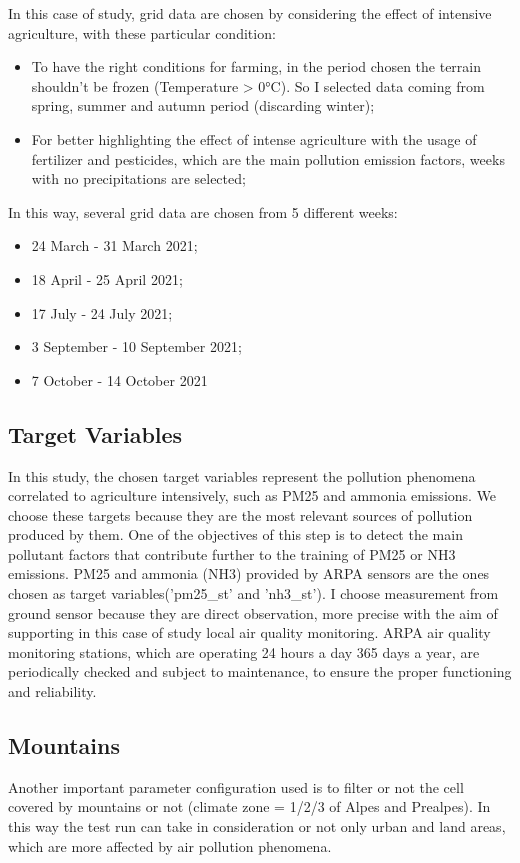 In this case of study, grid data are chosen by considering the effect of intensive agriculture, with these particular condition:
    \begin{itemize}
        \item To have the right conditions for farming, in the period chosen the terrain shouldn't be frozen (Temperature > 0°C). So I selected data coming from spring, summer and autumn period (discarding winter);
        \item For better highlighting the effect of intense agriculture with the usage of fertilizer and pesticides, which are the main pollution emission factors, weeks with no precipitations are selected;
\end{itemize}
In this way, several grid data are chosen from 5 different weeks:
\begin{itemize}
    \item 24 March - 31 March 2021;
    \item 18 April - 25 April 2021;
    \item 17 July - 24 July 2021;
    \item 3 September - 10 September 2021;
    \item 7 October - 14 October 2021
\end{itemize}

\subsection{Target Variables}
In this study, the chosen target variables represent the pollution phenomena correlated to agriculture intensively, such as PM25 and ammonia emissions. We choose these targets because they are the most relevant sources of pollution produced by them.\newline
One of the objectives of this step is to detect the main pollutant factors that contribute further to the training of PM25 or NH3 emissions.
PM25 and ammonia (NH3) provided by ARPA sensors are the ones chosen as target variables('pm25\_st' and 'nh3\_st').
I choose measurement from ground sensor because they are direct observation, more precise with the aim of supporting in this case of study local air quality monitoring. 
ARPA air quality monitoring stations, which are operating 24 hours a day 365 days a year, are periodically checked and subject to maintenance, to ensure the proper functioning and reliability.

\subsection{Mountains}
Another important parameter configuration used is to filter or not the cell covered by mountains or not (climate zone = 1/2/3 of Alpes and Prealpes). In this way the test run can take in consideration or not only urban and land areas, which are more affected by air pollution phenomena.

